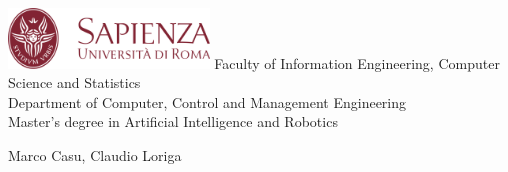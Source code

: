 \documentclass[10pt, letterpaper]{report}
\title{\titolo} %
\author{Marco Casu, Claudio Loriga}
\date{\vspace{-5ex}}
\begin{document}
\begin{titlepage}

	\vfill
	\centering \includegraphics[width=0.4\textwidth ]{preamble/Stemma_sapienza.png} \acc
	\centering \Large {\color{sapienza}Faculty of Information Engineering, Computer Science and Statistics\\
		Department of Computer, Control and Management Engineering\\
		Master's degree in Artificial Intelligence and Robotics}
	\bigskip
	\begin{center}
		\HUGE Marco Casu, Claudio Loriga\acc
	\end{center}
	\thispagestyle{empty}
	\begin{figure}[h]
	\end{figure}
\end{titlepage}
\end{document}
